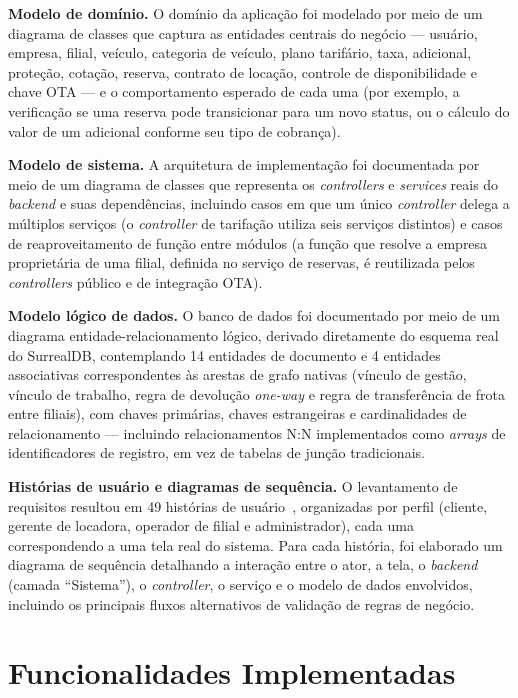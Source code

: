 \documentclass[conference,a4paper]{IEEEtran}
\begin{document}
\textbf{Modelo de domínio.} O domínio da aplicação foi modelado por meio de um diagrama de classes que captura as entidades centrais do negócio --- usuário, empresa, filial, veículo, categoria de veículo, plano tarifário, taxa, adicional, proteção, cotação, reserva, contrato de locação, controle de disponibilidade e chave OTA --- e o comportamento esperado de cada uma (por exemplo, a verificação se uma reserva pode transicionar para um novo status, ou o cálculo do valor de um adicional conforme seu tipo de cobrança).

\textbf{Modelo de sistema.} A arquitetura de implementação foi documentada por meio de um diagrama de classes que representa os \textit{controllers} e \textit{services} reais do \textit{backend} e suas dependências, incluindo casos em que um único \textit{controller} delega a múltiplos serviços (o \textit{controller} de tarifação utiliza seis serviços distintos) e casos de reaproveitamento de função entre módulos (a função que resolve a empresa proprietária de uma filial, definida no serviço de reservas, é reutilizada pelos \textit{controllers} público e de integração OTA).

\textbf{Modelo lógico de dados.} O banco de dados foi documentado por meio de um diagrama entidade-relacionamento lógico, derivado diretamente do esquema real do SurrealDB, contemplando 14 entidades de documento e 4 entidades associativas correspondentes às arestas de grafo nativas (vínculo de gestão, vínculo de trabalho, regra de devolução \textit{one-way} e regra de transferência de frota entre filiais), com chaves primárias, chaves estrangeiras e cardinalidades de relacionamento --- incluindo relacionamentos N:N implementados como \textit{arrays} de identificadores de registro, em vez de tabelas de junção tradicionais.

\textbf{Histórias de usuário e diagramas de sequência.} O levantamento de requisitos resultou em 49 histórias de usuário~\cite{cohn2004}, organizadas por perfil (cliente, gerente de locadora, operador de filial e administrador), cada uma correspondendo a uma tela real do sistema. Para cada história, foi elaborado um diagrama de sequência detalhando a interação entre o ator, a tela, o \textit{backend} (camada ``Sistema''), o \textit{controller}, o serviço e o modelo de dados envolvidos, incluindo os principais fluxos alternativos de validação de regras de negócio.

\section{Funcionalidades Implementadas}
\end{document}
